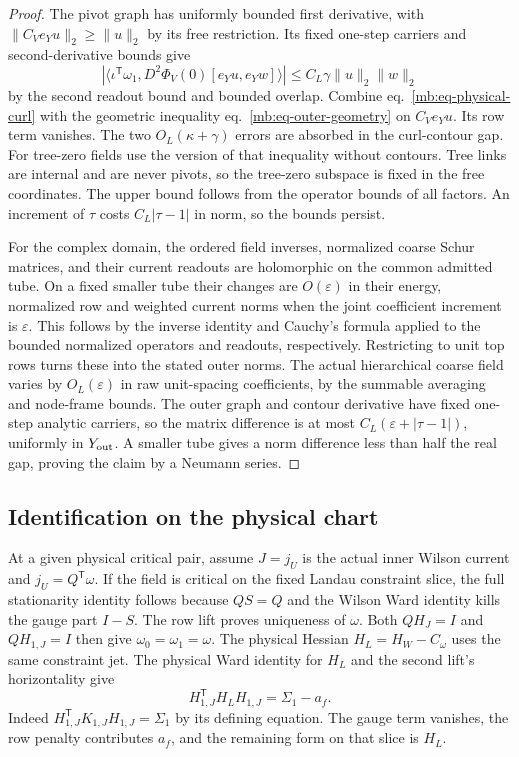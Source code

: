 \documentclass[11pt,letterpaper,reqno]{amsart}
\numberwithin{equation}{section}
\renewcommand{\eqref}[1]{\textup{eq.~\ref{#1}}}
\theoremstyle{definition}
\theoremstyle{remark}
\begin{document}
\begin{proof}
The pivot graph has uniformly bounded first derivative,
with \(\|C_Ve_Yu\|_2\ge\|u\|_2\) by its free restriction.
Its fixed one-step carriers and second-derivative bounds
give
\[
 |\langle\iota^{\mathsf T}\omega_1,
          D^2\Phi_V(0)[e_Yu,e_Yw]\rangle|
                  \le C_L\gamma\|u\|_2\|w\|_2
\]
by the second readout bound and bounded overlap.
Combine \eqref{mb:eq-physical-curl} with the geometric
inequality \eqref{mb:eq-outer-geometry} on \(C_Ve_Yu\).
Its row term vanishes. The two \(O_L(\kappa+\gamma)\)
errors are absorbed in the curl-contour gap.
For tree-zero fields use the version of that inequality
without contours. Tree links are internal and are never
pivots, so the tree-zero subspace is fixed in the free
coordinates. The upper bound follows from the operator
bounds of all factors. An increment of \(\tau\) costs
\(C_L|\tau-1|\) in norm, so the bounds persist.

For the complex domain, the ordered field inverses,
normalized coarse Schur matrices, and their current
readouts are holomorphic on the common admitted tube.
On a fixed smaller tube their changes are \(O(\varepsilon)\)
in their energy, normalized row and weighted current
norms when the joint coefficient increment is
\(\varepsilon\). This follows by the inverse identity
and Cauchy's formula applied to the bounded normalized
operators and readouts, respectively. Restricting to
unit top rows turns these into the stated outer norms.
The actual hierarchical coarse field varies by
\(O_L(\varepsilon)\) in raw unit-spacing coefficients,
by the summable averaging and node-frame bounds.
The outer graph and contour derivative have fixed
one-step analytic carriers, so the matrix difference
is at most \(C_L(\varepsilon+|\tau-1|)\), uniformly in
\(Y_{\rm out}\). A smaller tube gives a norm difference
less than half the real gap, proving the claim by
a Neumann series.
\end{proof}

\subsection{Identification on the physical chart}

At a given physical critical pair, assume \(J=j_U\) is the
actual inner Wilson current and \(j_U=Q^{\mathsf T}\omega\).
If the field is critical on the fixed Landau constraint
slice, the full stationarity identity follows because
\(QS=Q\) and the Wilson Ward identity kills the gauge
part \(I-S\). The row lift proves uniqueness of \(\omega\).
Both \(QH_J=I\) and \(QH_{1,J}=I\) then give
\(\omega_0=\omega_1=\omega\). The physical Hessian
\(H_L=H_W-C_\omega\) uses the same constraint jet.
The physical Ward identity for \(H_L\) and the second
lift's horizontality give
\begin{equation}\label{mb:eq-physical-lift-readout}
 H_{1,J}^{\mathsf T}H_LH_{1,J}=\Sigma_1-a_f .
\end{equation}
Indeed \(H_{1,J}^{\mathsf T}K_{1,J}H_{1,J}=\Sigma_1\)
by its defining equation. The gauge term vanishes,
the row penalty contributes \(a_f\), and the remaining
form on that slice is \(H_L\).
\end{document}
